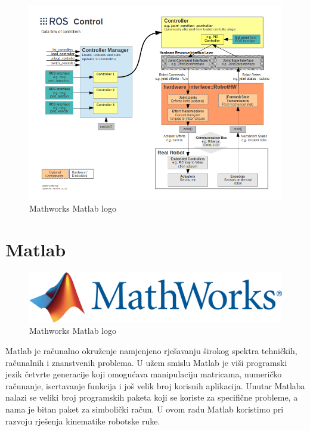 \documentclass[times, utf8, diplomski, numeric]{fer}
\begin{document}
\begin{figure}[h!]
\centering
\includegraphics[scale=1]{gazebo_ros_control}
\caption{Mathworks Matlab logo}
\end{figure}

\section{Matlab}
\begin{figure}[h!]
\centering
\includegraphics[scale=0.4]{logo_mathworks}
\caption{Mathworks Matlab logo}
\end{figure}
Matlab je računalno okruženje namjenjeno rješavanju širokog spektra tehničkih, računalnih i znanstvenih problema.
U užem smislu Matlab je viši programski jezik četvrte generacije koji omogućava manipulaciju matricama, numeričko računanje, iscrtavanje funkcija i još velik broj korisnih aplikacija.
Unutar Matlaba nalazi se veliki broj programskih paketa koji se koriste za specifične probleme, a nama je bitan paket za simbolički račun.
U ovom radu Matlab koristimo pri razvoju rješenja kinematike robotske ruke.
\end{document}
